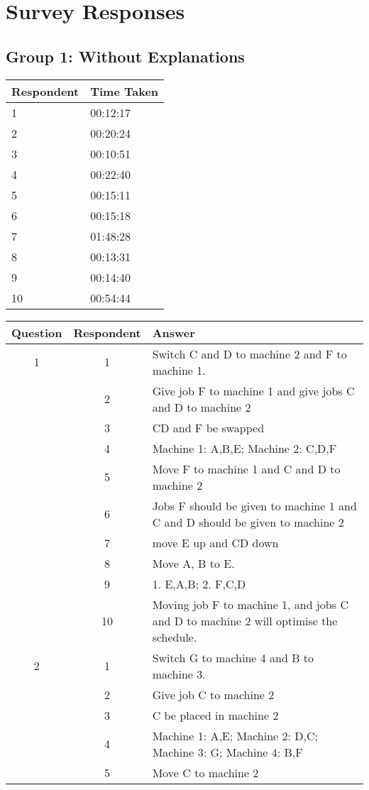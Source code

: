 \chapter{Survey Responses}

\section{Group 1: Without Explanations}
\label{group1data}

\begin{tabular}{l l}
	Respondent & Time Taken \\
	\hline
	1 & 00:12:17 \\
	2 & 00:20:24 \\
	3 & 00:10:51 \\
	4 & 00:22:40 \\
	5 & 00:15:11 \\
	6 & 00:15:18 \\
	7 & 01:48:28 \\
	8 & 00:13:31 \\
	9 & 00:14:40 \\
	10 & 00:54:44 \\
\end{tabular}
\linespace
\begin{tabularx}{\linewidth}{c c X}
	Question & Respondent & Answer \\
	\hline
	1 & 1 & Switch C and D to machine 2 and F to machine 1. \\
	& 2 & Give job F to machine 1 and give jobs C and D to machine 2 \\
	& 3 & CD and F be swapped \\
	& 4 & Machine 1: A,B,E; Machine 2: C,D,F \\
	& 5 & Move F to machine 1 and C and D to machine 2 \\
	& 6 & Jobs F should be given to machine 1 and C and D should be given to machine 2 \\
	& 7 & move E up and CD down  \\
	& 8 & Move A, B to E. \\
	& 9 & 1. E,A,B; 2. F,C,D \\
	& 10 & Moving job F to machine 1, and jobs C and D to machine 2 will optimise the schedule. \\
	\hline
	2 & 1 & Switch G to machine 4 and B to machine 3. \\
	& 2 & Give job C to machine 2 \\
	& 3 & C be placed in machine 2 \\
	& 4 & Machine 1: A,E; Machine 2: D,C; Machine 3: G; Machine 4: B,F \\
	& 5 & Move C to machine 2 \\
\end{tabularx}
